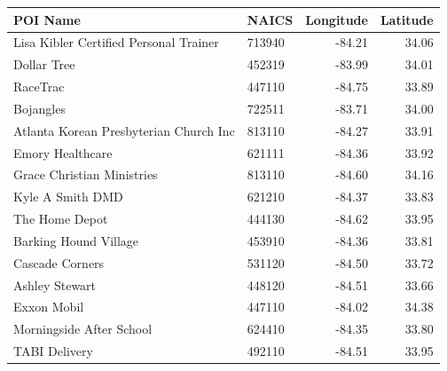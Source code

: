 \begin{tabular}{llrr}
	\hline
	POI Name                               & NAICS  & Longitude & Latitude \\ \hline
	Lisa Kibler Certified Personal Trainer & 713940 &    -84.21 &    34.06 \\
	Dollar Tree                            & 452319 &    -83.99 &    34.01 \\
	RaceTrac                               & 447110 &    -84.75 &    33.89 \\
	Bojangles                              & 722511 &    -83.71 &    34.00 \\
	Atlanta Korean Presbyterian Church Inc & 813110 &    -84.27 &    33.91 \\
	Emory Healthcare                       & 621111 &    -84.36 &    33.92 \\
	Grace Christian Ministries             & 813110 &    -84.60 &    34.16 \\
	Kyle A Smith DMD                       & 621210 &    -84.37 &    33.83 \\
	The Home Depot                         & 444130 &    -84.62 &    33.95 \\
	Barking Hound Village                  & 453910 &    -84.36 &    33.81 \\
	Cascade Corners                        & 531120 &    -84.50 &    33.72 \\
	Ashley Stewart                         & 448120 &    -84.51 &    33.66 \\
	Exxon Mobil                            & 447110 &    -84.02 &    34.38 \\
	Morningside After School               & 624410 &    -84.35 &    33.80 \\
	TABI Delivery                          & 492110 &    -84.51 &    33.95 \\ \hline
\end{tabular}